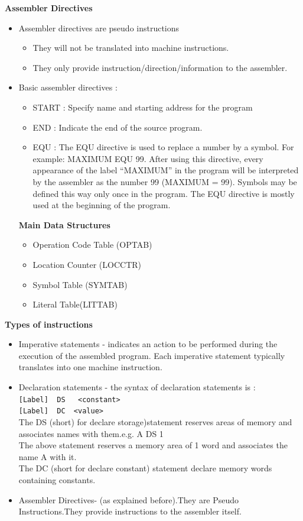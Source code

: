 \documentclass[12pt]{article}
\begin{document}
\textbf{Assembler Directives}
\begin{itemize}
\item Assembler directives are pseudo instructions \begin{itemize}
  \item They will not be translated into machine instructions.
  \item They only provide instruction/direction/information to the assembler.
\end{itemize}
\item Basic assembler directives : \begin{itemize}
  \item START : Specify name and starting address for the program
  \item END : Indicate the end of the source program.  \item EQU : The EQU directive is used to replace a number by a symbol. For example: MAXIMUM EQU 99. After using this directive, every appearance of the label “MAXIMUM” in the program will be interpreted by the assembler as the number 99 (MAXIMUM = 99). Symbols may be defined this way only once in the program. The EQU directive is mostly used at the beginning of the program.
\end{itemize}\textbf{Main Data Structures}\begin{itemize}
  \item Operation Code Table (OPTAB)
  \item Location Counter (LOCCTR) \item Symbol Table (SYMTAB) \item Literal Table(LITTAB) 
\end{itemize}\end{itemize}
\textbf{Types of instructions}
\begin{itemize}
  \item Imperative statements
-
indicates an action to be performed during the execution of 
the  assembled  program.  Each  imperative  statement  typically  translates  into  one machine instruction.
  \item Declaration statements
-
the syntax of declaration statements is :\\
\verb|[Label]  DS   <constant>|\\
\verb|[Label]  DC  <value>|\\
The  DS  (short)  for  declare  storage)statement  reserves  areas  of  memory  and 
associates names with them.e.g. 
A    DS   1\\
The  above  statement  reserves  a  memory  area  of  1  word  and  associates  the 
name A with it.\\
The   DC   (short   for   declare   constant)   statement   declare   memory   words 
containing constants.
  \item Assembler Directives- (as explained before).They are Pseudo Instructions.They provide instructions to the assembler itself.
\end{itemize}
\end{document}
